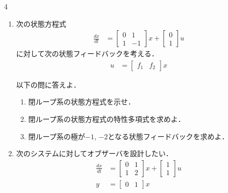 \documentclass[fleqn]{article}
\renewcommand{\bmatrix}{\left[\begin{array}}
\newcommand{\ematrix}{\end{array}\right]}
\begin{document}
\begin{multicols}{4}
\begin{enumerate}


\item
次の状態方程式
\begin{align}
	\frac{dx}{dt} 
	& =	\bmatrix{rr}
			0 & 1  \\
			1 & -1 
		\ematrix
		x
		+
		\bmatrix{c}
			0 \\
			1
		\ematrix
		u 
\nonumber %
\end{align}
に対して次の状態フィードバックを考える．
\begin{align}
	u & = \bmatrix{ccc} f_1 & f_2 \ematrix x
\nonumber %
\end{align}

以下の問に答えよ．
\begin{enumerate}
\item
閉ループ系の状態方程式を示せ．
\vspace{6cm}

\item
閉ループ系の状態方程式の特性多項式を求めよ．
\vspace{6cm}

\item
閉ループ系の極が$-1$, $-2$となる状態フィードバックを求めよ．

\end{enumerate}
\vfill\null
\columnbreak







\item
次のシステムに対してオブザーバを設計したい．
\begin{align}
	\frac{dx}{dt}
	&=	\bmatrix{cc}
			0 & 1 \\
			1 & 2
		\ematrix
		x
		+
		\bmatrix{c}
			1 \\
			1 
		\ematrix
		u
\nonumber \\
	y 
	&=	\bmatrix{cc}
			0 & 1 
		\ematrix
		x
\nonumber 
\end{align}


\end{enumerate}
\end{multicols}
\end{document}
